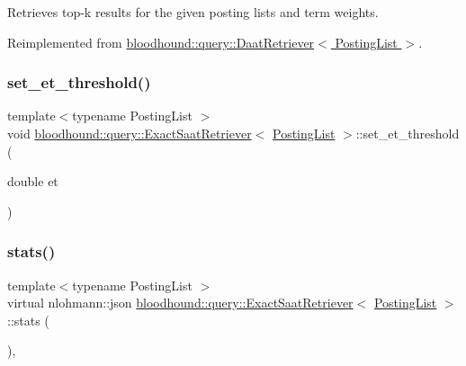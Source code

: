 Retrieves top-\/k results for the given posting lists and term weights. 



Reimplemented from \hyperlink{classbloodhound_1_1query_1_1DaatRetriever_ab80b4867fc263827dc2fdbe0965a2e8c}{bloodhound\+::query\+::\+Daat\+Retriever$<$ Posting\+List $>$}.

\mbox{\label{classbloodhound_1_1query_1_1ExactSaatRetriever_a78016cfffe921ed440dec62c6f82f4cc}} 
\subsubsection{\texorpdfstring{set\+\_\+et\+\_\+threshold()}{set\_et\_threshold()}}
{\footnotesize\ttfamily template$<$typename Posting\+List $>$ \\
void \hyperlink{classbloodhound_1_1query_1_1ExactSaatRetriever}{bloodhound\+::query\+::\+Exact\+Saat\+Retriever}$<$ \hyperlink{classbloodhound_1_1PostingList}{Posting\+List} $>$\+::set\+\_\+et\+\_\+threshold (\begin{DoxyParamCaption}\item[{double}]{et }\end{DoxyParamCaption})\hspace{0.3cm}{\ttfamily [inline]}}

\mbox{\label{classbloodhound_1_1query_1_1ExactSaatRetriever_a716838f463f124964e76f48bc37d32cc}} 
\subsubsection{\texorpdfstring{stats()}{stats()}}
{\footnotesize\ttfamily template$<$typename Posting\+List $>$ \\
virtual nlohmann\+::json \hyperlink{classbloodhound_1_1query_1_1ExactSaatRetriever}{bloodhound\+::query\+::\+Exact\+Saat\+Retriever}$<$ \hyperlink{classbloodhound_1_1PostingList}{Posting\+List} $>$\+::stats (\begin{DoxyParamCaption}{ }\end{DoxyParamCaption})\hspace{0.3cm}{\ttfamily [inline]}, {\ttfamily [virtual]}}



